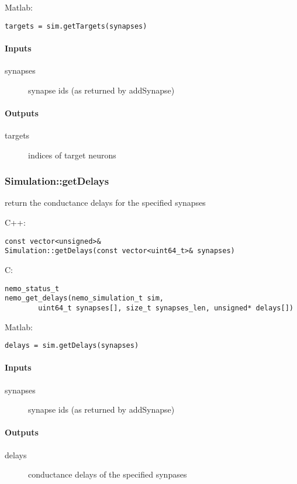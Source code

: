 \noindent Matlab:
\begin{lstlisting}[aboveskip=2pt]
targets = sim.getTargets(synapses)
\end{lstlisting}
\paragraph{Inputs}
\begin{description}
\item[synapses] synapse ids (as returned by addSynapse)
\end{description}
\paragraph{Outputs}
\begin{description}
\item[targets] indices of target neurons
\end{description}

\clearpage
\subsubsection*{Simulation::getDelays}
\label{fn: getDelays}
return the conductance delays for the specified synapses


\noindent C++:
\begin{lstlisting}[aboveskip=2pt]
const vector<unsigned>&
Simulation::getDelays(const vector<uint64_t>& synapses)
\end{lstlisting}

\noindent C:
\begin{lstlisting}[aboveskip=2pt]
nemo_status_t
nemo_get_delays(nemo_simulation_t sim, 
        uint64_t synapses[], size_t synapses_len, unsigned* delays[])
\end{lstlisting}

\noindent Matlab:
\begin{lstlisting}[aboveskip=2pt]
delays = sim.getDelays(synapses)
\end{lstlisting}
\paragraph{Inputs}
\begin{description}
\item[synapses] synapse ids (as returned by addSynapse)
\end{description}
\paragraph{Outputs}
\begin{description}
\item[delays] conductance delays of the specified synpases
\end{description}

